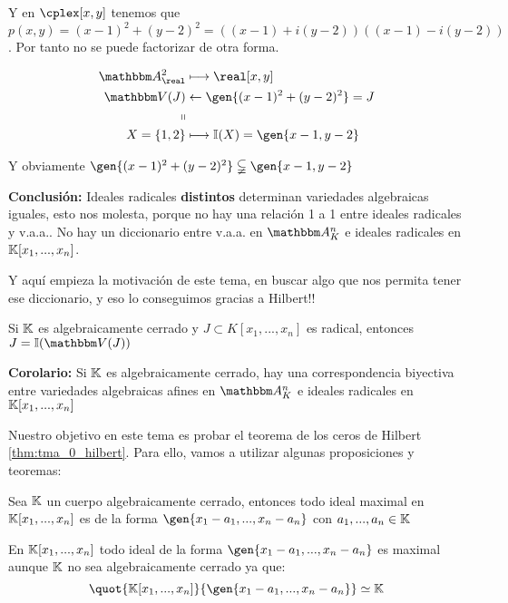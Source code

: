 \begin{itemize}
\begin{example}
\begin{enumerate}
			Y en $\cplex[x,y]$ tenemos que $p(x,y)=(x-1)^2+(y-2)^2=((x-1)+i(y-2))((x-1)-i(y-2))$. Por tanto no se puede factorizar de otra forma.

			\begin{align*}
				\A^2_{\real} & \longmapsto  \real[x,y] \\
				\V(J) & \leftarrow  \gen{(x-1)^2+(y-2)^2}=J \\
				\shortparallel & \\
				X=\{1,2\} & \longmapsto  \I(X)=\gen{x-1,y-2}\\
			\end{align*}

			Y obviamente $\gen{(x-1)^2+(y-2)^2} \subsetneqq \gen{x-1,y-2}$
		\end{enumerate}
	\end{example}
\end{itemize}

\textbf{Conclusión:} Ideales radicales \textbf{distintos} determinan variedades algebraicas iguales, esto nos molesta, porque no hay una relación 1 a 1 entre ideales radicales y v.a.a.. No hay un diccionario entre v.a.a. en $\Akn$ e ideales radicales en $\mathbb{K}[x_1,...,x_n]$.

Y aquí empieza la motivación de este tema, en buscar algo que nos permita tener ese diccionario, y eso lo conseguimos gracias a Hilbert!!

\begin{theorem}\label{thm:tma_0_hilbert}
	Si $\mathbb{K}$ es algebraicamente cerrado y $J \subset K[x_1,...,x_n]$ es radical, entonces $J=\I(\V(J))$
\end{theorem}



\textbf{Corolario:}	Si $\mathbb{K}$ es algebraicamente cerrado, hay una correspondencia biyectiva entre variedades algebraicas afines en $\Akn$ e ideales radicales en $\mathbb{K}[x_1,...,x_n]$

Nuestro objetivo en este tema es probar el teorema de los ceros de Hilbert \ref{thm:tma_0_hilbert}. Para ello, vamos a utilizar algunas proposiciones y teoremas:

\begin{theorem}
	Sea $\mathbb{K}$ un cuerpo algebraicamente cerrado, entonces todo ideal maximal en $\mathbb{K}[x_1,...,x_n]$ es de la forma $\gen{x_1-a_1,...,x_n-a_n}$ con $a_1,...,a_n \in \mathbb{K}$
\end{theorem}

\obs En $\mathbb{K}[x_1,...,x_n]$ todo ideal de la forma $\gen{x_1-a_1,...,x_n-a_n}$ es maximal aunque $\mathbb{K}$ no sea algebraicamente cerrado ya que:
$$ \quot{\K[x_1,...,x_n]}{\gen{x_1-a_1,...,x_n-a_n}} \simeq \K $$

